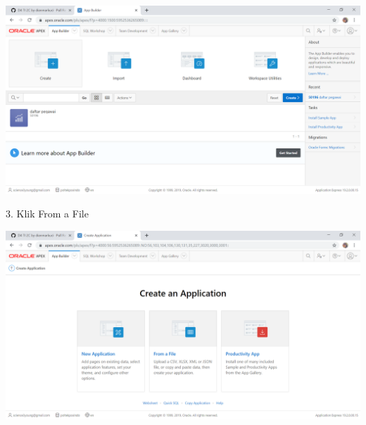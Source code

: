 \documentclass{article}
\begin{document}
\begin{center}
    \includegraphics[width=10cm\textwidth]{gambar/2.png}
    \end{center}
    

    \item 3. Klik From a File
\begin{center}
    \includegraphics[width=10cm\textwidth]{gambar/3.png}
    \end{center}
    
\end{document}
